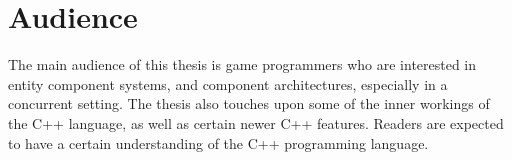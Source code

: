 \section{Audience}
The main audience of this thesis is game programmers who are interested in entity component systems,
and component architectures, especially in a concurrent setting.
The thesis also touches upon some of the inner workings of the C++ language, as well as certain newer C++ features.
Readers are expected to have a certain understanding of the C++ programming language.
